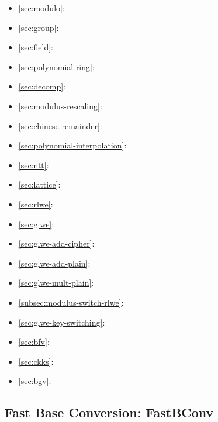 \begin{tcolorbox}[
    title = \textbf{Required Background},    %
    colback = white,    %
    colframe = black,  %
    boxrule = 0.8pt,     %
    left = 1mm, right = 1mm, top = 1mm, bottom = 1mm %
]

\begin{itemize}
\item \autoref{sec:modulo}: 
\item \autoref{sec:group}: 
\item \autoref{sec:field}: 
\item \autoref{sec:polynomial-ring}: 
\item \autoref{sec:decomp}: 
\item \autoref{sec:modulus-rescaling}: 
\item \autoref{sec:chinese-remainder}: 
\item \autoref{sec:polynomial-interpolation}: 
\item \autoref{sec:ntt}: 
\item \autoref{sec:lattice}: 
\item \autoref{sec:rlwe}: 
\item \autoref{sec:glwe}: 
\item \autoref{sec:glwe-add-cipher}: 
\item \autoref{sec:glwe-add-plain}: 
\item \autoref{sec:glwe-mult-plain}: 
\item \autoref{subsec:modulus-switch-rlwe}: 
\item \autoref{sec:glwe-key-switching}: 
\item \autoref{sec:bfv}: 
\item \autoref{sec:ckks}: 
\item \autoref{sec:bgv}: 
\end{itemize}
\end{tcolorbox}

\clearpage 

\subsection{Fast Base Conversion: \textsf{FastBConv}}
\label{subsec:rns-fastbconv}

